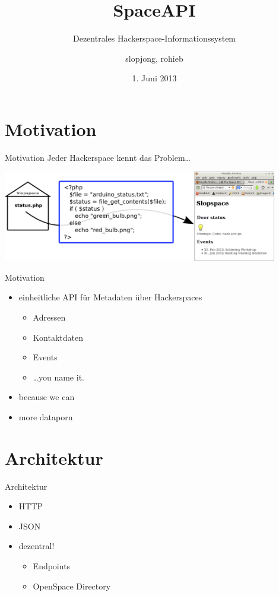 \documentclass{beamer}
\author{slopjong, rohieb}
\title{SpaceAPI}
\subtitle{Dezentrales Hackerspace-Informationssystem}
\institute{GPN13}
\date{1. Juni 2013}
\begin{document}
\begin{frame}
	\maketitle
\end{frame}

\section{Motivation}
\begin{frame}{Motivation}
	Jeder Hackerspace kennt das Problem\ldots
	\begin{center}
	\includegraphics[width=0.9\textwidth]{openclose-impl.png}
	\end{center}
\end{frame}

\begin{frame}{Motivation}
\begin{itemize}
	\item einheitliche API für Metadaten über Hackerspaces
	\pause
	\begin{itemize}
		\item Adressen
		\item Kontaktdaten
		\item Events
		\item \ldots you name it.
	\end{itemize}
	\pause
	\item because we can
	\item more dataporn
\end{itemize}
\end{frame}

\section{Architektur}
\begin{frame}{Architektur}
\begin{itemize}
	\item HTTP
	\item JSON
	\item dezentral!
	\begin{itemize}
		\item Endpoints
		\item OpenSpace Directory
	\end{itemize}
\end{itemize}
\end{frame}
\end{document}
